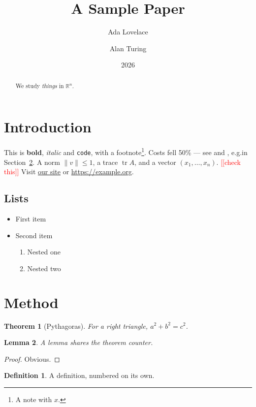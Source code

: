 \documentclass{article}
\title{A Sample Paper}
\author{Ada Lovelace \and Alan Turing}
\date{2026}
\newcommand{\R}{\mathbb{R}}
\newcommand{\norm}[1]{\lVert #1 \rVert}
\newcommand{\vect}[2][x]{(#1_1, \dots, #1_{#2})}
\newcommand\todo[1]{\textcolor{red}{[[#1]]}}
\newcommand{\eg}{e.g.}
\DeclareMathOperator{\tr}{tr}
\newtheorem{theorem}{Theorem}[section]
\newtheorem{lemma}[theorem]{Lemma}
\theoremstyle{definition}
\newtheorem{definition}{Definition}
\begin{document}
\maketitle

\begin{abstract}
We study \emph{things} in $\R^n$.
\end{abstract}

\section{Introduction}\label{sec:intro}

This is \textbf{bold}, \textit{italic} and \texttt{code}, with a footnote\footnote{A note with $x$.}.
Costs fell 50\% --- see \cite{knuth1984} and \cite[p.~3]{lamport1994}, \eg in Section~\ref{sec:method}.
A norm $\norm{v} \le 1$, a trace $\tr A$, and a vector $\vect{n}$. \todo{check this}
Visit \href{https://example.com}{our site} or \url{https://example.org}.

\subsection{Lists}

\begin{itemize}
  \item First item
  \item Second item
  \begin{enumerate}
    \item Nested one
    \item Nested two
  \end{enumerate}
\end{itemize}

\section{Method}\label{sec:method}

\begin{theorem}[Pythagoras]\label{thm:pyth}
For a right triangle, $a^2 + b^2 = c^2$.
\end{theorem}

\begin{lemma}
A lemma shares the theorem counter.
\end{lemma}

\begin{proof}
Obvious.
\end{proof}

\begin{definition}
A definition, numbered on its own.
\end{definition}
\end{document}
